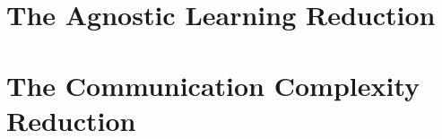 \section{The Agnostic Learning Reduction}\label{sec:learningreductions}


\section{The Communication Complexity Reduction}\label{sec:communication}

